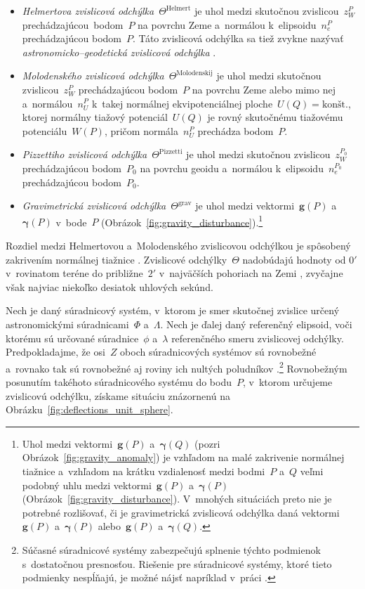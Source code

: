 \documentclass[a4paper, 12pt]{book}
\let\vec\mathbf
\begin{document}
\begin{itemize}
\item \emph{Helmertova zvislicová odchýlka}~$\Theta^\mathrm{Helmert}$ je uhol 
medzi skutočnou zvislicou~$z_W^P$ prechádzajúcou~bodom~$P$ na povrchu Zeme 
a~normálou k~elipsoidu~$n_e^P$ prechádzajúcou bodom~$P$.  Táto zvislicová 
odchýlka sa tiež zvykne nazývať \textit{astronomicko--geodetická zvislicová 
odchýlka} \parencite{Jekeli1999b}.

\item \emph{Molodenského zvislicová odchýlka}~$\Theta^\mathrm{Molodenskij}$ je 
uhol medzi skutočnou zvislicou~$z_W^P$ prechádzajúcou bodom~$P$ na povrchu Zeme 
alebo mimo nej a~normálou~$n_U^P$ k~takej normálnej ekvipotenciálnej 
ploche~$U(Q) = \textrm{kon\v{s}t.}$, ktorej normálny tiažový potenciál~$U(Q)$ 
je rovný skutočnému tiažovému potenciálu~$W(P)$, pričom normála~$n_U^P$ 
prechádza bodom~$P$.

\item \emph{Pizzettiho zvislicová odchýlka}~$\Theta^\mathrm{Pizzetti}$ je uhol 
medzi skutočnou zvislicou~$z_W^{P_0}$ prechádzajúcou bodom~$P_0$ na povrchu 
geoidu a~normálou k~elipsoidu~$n_e^{P_0}$ prechádzajúcou bodom~$P_0$.

\item \emph{Gravimetrická zvislicová odchýlka}~$\Theta^\mathrm{grav}$ je uhol 
medzi vektormi~$\vec g(P)$ a~$\boldsymbol\gamma(P)$ v~bode~$P$ 
(Obrázok~\ref{fig:gravity_disturbance}).\footnote{Uhol medzi vektormi~$\vec 
g(P)$ a~$\boldsymbol\gamma(Q)$ (pozri Obrázok~\ref{fig:gravity_anomaly}) je 
vzhľadom na malé zakrivenie normálnej tiažnice a~vzhľadom na krátku vzdialenosť 
medzi bodmi~$P$ a~$Q$ veľmi podobný uhlu medzi vektormi~$\vec g(P)$ 
a~$\boldsymbol\gamma(P)$ (Obrázok~\ref{fig:gravity_disturbance}).  V~mnohých 
situáciách preto nie je potrebné rozlišovať, či je gravimetrická zvislicová 
odchýlka daná vektormi~$\vec g(P)$ a~$\boldsymbol\gamma(P)$ alebo~$\vec g(P)$ 
a~$\boldsymbol\gamma(Q)$.}
\end{itemize}
%
Rozdiel medzi Helmertovou a~Molodenského zvislicovou odchýlkou je spôsobený 
zakrivením normálnej tiažnice \parencite{Jekeli1999b}.  Zvislicové 
odchýlky~$\Theta$ nadobúdajú hodnoty od $0'$ v~rovinatom teréne do 
približne~$2'$ v~najväčších pohoriach na Zemi \parencite{GGMplus}, zvyčajne 
však najviac niekoľko desiatok uhlových sekúnd.

Nech je daný súradnicový systém, v~ktorom je smer skutočnej zvislice určený 
astronomickými súradnicami~$\Phi$ a~$\Lambda$.  Nech je ďalej daný referenčný 
elipsoid, voči ktorému sú určované súradnice~$\phi$ a~$\lambda$ referenčného 
smeru zvislicovej odchýlky.  Predpokladajme, že osi~$Z$ oboch súradnicových 
systémov sú rovnobežné a~rovnako tak sú rovnobežné aj roviny ich nultých 
poludníkov \parencite{TorgeGeodesy}.\footnote{Súčasné súradnicové systémy 
zabezpečujú splnenie týchto podmienok s~dostatočnou presnosťou.  Riešenie pre 
súradnicové systémy, ktoré tieto podmienky nespĺňajú, je možné nájsť napríklad 
v~práci \textcite{Pick2000}.}  Rovnobežným posunutím takéhoto súradnicového 
systému do bodu~$P$, v~ktorom určujeme zvislicovú odchýlku, získame situáciu 
znázornenú na Obrázku~\ref{fig:deflections_unit_sphere}.
\end{document}
